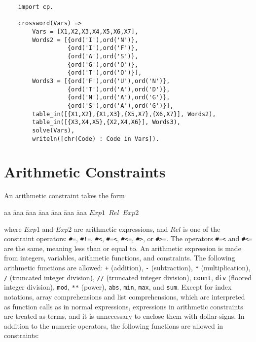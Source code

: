 \begin{verbatim}
    import cp.

    crossword(Vars) =>
        Vars = [X1,X2,X3,X4,X5,X6,X7], 
        Words2 = [{ord('I'),ord('N')},
                  {ord('I'),ord('F')},
                  {ord('A'),ord('S')},
                  {ord('G'),ord('O')},
                  {ord('T'),ord('O')}],
        Words3 = [{ord('F'),ord('U'),ord('N')},
                  {ord('T'),ord('A'),ord('D')},
                  {ord('N'),ord('A'),ord('G')},
                  {ord('S'),ord('A'),ord('G')}],
        table_in([{X1,X2},{X1,X3},{X5,X7},{X6,X7}], Words2),
        table_in([{X3,X4,X5},{X2,X4,X6}], Words3),
        solve(Vars),
        writeln([chr(Code) : Code in Vars]).
\end{verbatim}

\section{Arithmetic Constraints}
An arithmetic constraint takes the form
\begin{tabbing}
aa \= aaa \= aaa \= aaa \= aaa \= aaa \= aaa \kill
\> \texttt{$Exp1$ $Rel$ $Exp2$} 
\end{tabbing}
where $Exp1$ and $Exp2$ are arithmetic expressions, and $Rel$ is one of the constraint operators:  \verb+#=+, \verb+#!=+, \verb+#<+, \verb+#=<+, \verb+#<=+, \verb+#>+, or \verb+#>=+. The operators \verb+#=<+ and \verb+#<=+ are the same, meaning less than or equal to. An arithmetic expression is made from integers, variables, arithmetic functions, and constraints. The following arithmetic functions are allowed: \texttt{+} (addition), \texttt{-} (subtraction), \texttt{*} (multiplication), \texttt{/} (truncated integer division), \texttt{//} (truncated integer division), \texttt{count}, \texttt{div} (floored integer division), \texttt{mod}, \texttt{**} (power), \texttt{abs}, \texttt{min}, \texttt{max}, and \texttt{sum}.  Except for index notations, array comprehensions and list comprehensions, which are interpreted as function calls as in normal expressions, expressions in arithmetic constraints are treated as terms, and it is unnecessary to enclose them with dollar-signs. In addition to the numeric operators, the following functions are allowed in constraints:
